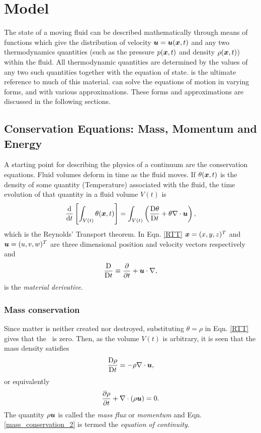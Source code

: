\section{\fluidity Model}
\label{fluid_dynamics_section}

The state of a moving fluid can be described mathematically through means of functions which give the distribution of velocity ${\mbox{\boldmath$u$}}={\mbox{\boldmath$u$}}({\mbox{\boldmath$x$}},t)$ and any two thermodynamics quantities (such as the pressure $p({\mbox{\boldmath$x$}},t)$ and density $\rho({\mbox{\boldmath$x$}},t)$) within the fluid. All thermodynamic quantities are determined by the values of any two such quantities together with the equation of state. \citet{batchelor_1967} is the ultimate reference to much of this material. \fluidity can solve the equations of motion in varying forms, and with various approximations. These forms and approximations are discussed in the following sections.

\subsection{Conservation Equations: Mass, Momentum and Energy}
A starting point for describing the physics of a continuum are the conservation equations. Fluid volumes deform in time as the fluid moves. If $\theta({\mbox{\boldmath$x$}},t)$ is the density of some quantity (\eg Temperature) associated with the fluid, the time evolution of that quantity in a fluid volume $V(t)$ is
\begin{equation}\label{RTT}
 \frac{\mathrm{d}}{\mathrm{d} t}\left[\int_{V(t)}\theta({\mbox{\boldmath$x$}},t)\right]=
 \int_{V(t)}\left(\frac{\mathrm{D}\theta}{\mathrm{D} t}+\theta\nabla\cdot{\mbox{\boldmath$u$}}\right),
\end{equation}
\noindent
which is the Reynolds' Transport theorem. In Eqn. \ref{RTT} ${\mbox{\boldmath$x$}}=(x,y,z)^T$ and ${\mbox{\boldmath$u$}}=(u,v,w)^T$ are three dimensional position and velocity vectors respectively and
\begin{equation}\label{MatDiv}
 \frac{\mathrm{D}}{\mathrm{D} t}\equiv\frac{\partial}{\partial{t}}+{\mbox{\boldmath$u$}}\cdot\nabla,
\end{equation}
is the \textit{material derivative}.

\subsubsection{Mass conservation}
Since matter is neither created nor destroyed, substituting $\theta=\rho$ in Eqn. \ref{RTT} gives that the \lhs\ is zero. Then, as the volume $V(t)$ is arbitrary, it is seen that the mass density satisfies
\begin{equation}\label{mass_conservation}
 \frac{\mathrm{D}\rho}{\mathrm{D} t}=-\rho\nabla\cdot{\mbox{\boldmath$u$}},
\end{equation}
or equivalently
\begin{equation}\label{mass_conservation_2}
 \frac{\partial\rho}{\partial{t}}+\nabla\cdot(\rho{\mbox{\boldmath$u$}})=0.
\end{equation}
The quantity $\rho{\mbox{\boldmath$u$}}$ is called the \textit{mass flux} or \textit{momentum} and Eqn. \ref{mass_conservation_2} is termed the \textit{equation of continuity}.

